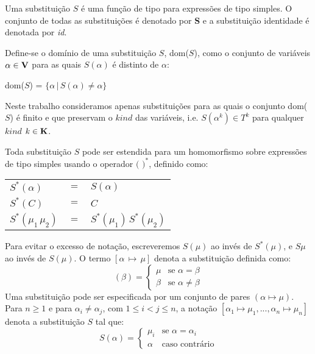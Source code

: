 Uma substitui\c{c}\~ao $S$ \'e uma fun\c{c}\~ao de tipo para express\~oes de tipo simples. O conjunto de todas as 
substitui\c{c}\~oes \'e denotado por \textbf{S} e a substitui\c{c}\~ao identidade \'e denotada por \textit{id}.

Define-se o dom\'inio de uma substitui\c{c}\~ao $S$, dom($S$), como o conjunto de vari\'aveis 
$\alpha\in\text{\textbf{V}}$ para as quais $S(\alpha)$ \'e distinto de $\alpha$: 
\begin{center}
	dom($S$) = $\{\alpha\,|\,S(\alpha)\neq\alpha\}$
\end{center}

Neste trabalho consideramos apenas substitui\c{c}\~oes para as quais o conjunto dom($S$) \'e finito e que preservam
o $kind$ das vari\'aveis, i.e. $S(\alpha^{k})\in T^{k}$ para qualquer $kind$ $k\in \text{\textbf{K}}$.

Toda substitui\c{c}\~ao $S$ pode ser estendida para um homomorfismo sobre express\~oes de tipo simples usando o operador
$\text{(  )}^{*}$, definido como:
\begin{center}
\begin{tabular}{lcl}
    $S^{*}(\alpha)$ & $=$ & $S(\alpha)$\\
    $S^{*}(C)$ & $=$ & $C$\\
    $S^{*}(\mu_{1}\,\mu_{2})$ & $=$ & $S^{*}(\mu_{1})\,S^{*}(\mu_{2})$\\
\end{tabular}
\end{center}
Para evitar o excesso de nota\c{c}\~ao, escreveremos $S(\mu)$ ao inv\'es de $S^{*}(\mu)$, e $S\mu$ ao
inv\'es de $S(\mu)$. O termo $[\alpha\,\mapsto\,\mu]$ denota a substitui\c{c}\~ao definida como:
\begin{equation*}
    [\alpha\,\mapsto\,\mu](\beta) = \left\{
    									\begin{array}{ll}
    										\mu  & \text{se } \alpha = \beta\\
    										\beta & \text{se } \alpha \neq \beta
    									\end{array}
                                     \right.
\end{equation*}
Uma substitui\c{c}\~ao pode ser especificada por um conjunto de pares $(\alpha\mapsto\mu)$. Para $n\geq 1$ e para
$\alpha_{i}\neq\alpha_{j}$, com $1\leq i < j\leq n$, a nota\c{c}\~ao 
$[\alpha_{1}\mapsto\mu_{1},...,\alpha_{n}\mapsto\mu_{n}]$ denota a substitui\c{c}\~ao $S$ tal que:
\begin{equation*}
    S(\alpha) = \left\{
                   \begin{array}{ll}
                   	   \mu_{i} & \text{se } \alpha = \alpha_{i}\\
                   	   \alpha   & \text{caso contr\'ario}
                   \end{array}
                \right.
\end{equation*}


